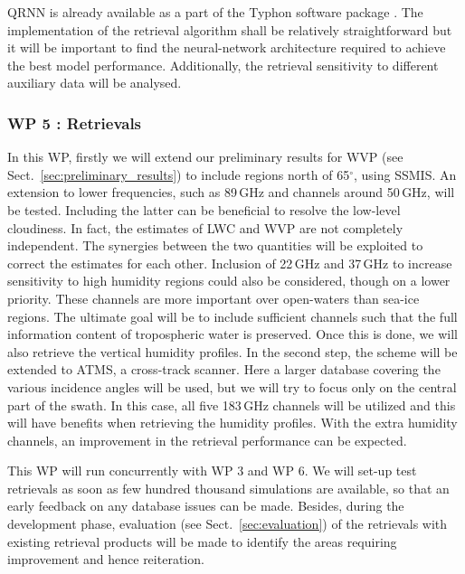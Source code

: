 \documentclass[12pt,oneside,a4paper]{article}
\begin{document}
QRNN is already available as a part of the Typhon software package
\citep{lemke:2020:typhon}. The implementation of the retrieval algorithm shall
be relatively straightforward but it will be important to find the
neural-network architecture required to achieve the best model performance.
Additionally, the retrieval sensitivity to different auxiliary data will be
analysed.


\vspace{-1.0ex}
\subsubsection*{WP 5 : Retrievals}
%
\label{sec:retrievals}
%
In this WP, firstly we will extend our preliminary results for WVP (see
Sect.~\ref{sec:preliminary_results}) to include regions north of 65$^\circ$,
using SSMIS. An extension to lower frequencies, such as 89\,GHz and channels around 50\,GHz, will be tested. Including the latter can be beneficial to resolve the low-level cloudiness. In fact, the estimates of LWC and WVP are not completely independent. The synergies between the two quantities will be exploited to correct the estimates for each other. Inclusion of 22\,GHz and 37\,GHz to increase sensitivity to high humidity regions could also be considered, though on a lower priority. These channels are more important over open-waters than sea-ice regions. The ultimate goal will be to include sufficient channels such that the full information content of tropospheric water is preserved. Once this is done, we will also retrieve the vertical humidity profiles. In the second step, the scheme will be extended to ATMS, a cross-track scanner. Here a larger database covering the various incidence angles will be used, but we will try to focus only on the central part of the swath. In this case, all five 183\,GHz channels will be utilized and this will have benefits when retrieving the humidity profiles. With the extra humidity channels, an improvement in the retrieval performance can be expected.  


This WP will run concurrently with WP 3 and WP 6. We will set-up test retrievals as soon as few hundred thousand simulations are available, so that an early feedback on any database issues can be made. Besides, during the development phase, evaluation (see Sect.~\ref{sec:evaluation}) of the retrievals with existing retrieval products will be made to identify the areas requiring improvement and hence reiteration.
\end{document}

